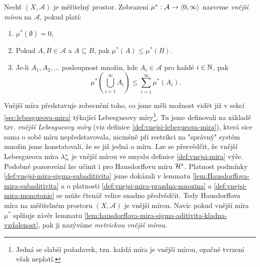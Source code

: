 \begin{definition}\label{def:vnejsi-mira}
    Nechť $(X,\mathcal{A})$ je měřitelný prostor. Zobrazení $\mu^*:\mathcal{A} \rightarrow \langle0,\infty\rangle$ nazveme \emph{vnější mírou} na $\mathcal{A}$, pokud platí:
    \begin{enumerate}[label=(\alph*)]
        \item\label{def:vnejsi-mira-prazdna-mnozina} $\mu^*(\emptyset)=0$,
        \item\label{def:vnejsi-mira-monotonie} Pokud $A,B\in\mathcal{A}$ a $A\subseteq B$, pak $\mu^*(A)\leqslant\mu^*(B)$.
        \item\label{def:vnejsi-mira-sigma-subaditivita} Je-li $A_1,A_2,\ldots$ posloupnost množin, kde $A_i\in\mathcal{A}$ pro každé $i\in\mathbb{N}$, pak
        \[\mu^*\left(\bigcup_{i=1}^\infty A_i\right)\leqslant\sum_{i=1}^{\infty}\mu^*(A_i).\]
    \end{enumerate}
\end{definition}

Vnější míra představuje zobecnění toho, co jsme měli možnost vidět již v sekci \ref{sec:lebesgueova-mira} týkající Lebesgueovy míry\footnote{Jedná se slabší požadavek, tzn. každá míra je vnější mírou, opačné tvrzení však neplatí.}. Tu jsme definovali na základě tzv. \emph{vnější Lebesgueovy míry} (viz definice \ref{def:vnejsi-lebegueova-mira}), která sice sama o sobě míru nepředstavovala, nicméně při restrikci na "správný" systém množin jsme konstatovali, že se již jedná o míru. Lze se přesvědčit, že vnější Lebesgueova míra $\lambda_n^*$ je vnější mírou ve smyslu definice \ref{def:vnejsi-mira} výše. Podobné pozorování lze učinit i pro Hausdorffovu míru $\mathcal{H}^{s}$. Platnost podmínky \ref{def:vnejsi-mira-sigma-subaditivita} jsme dokázali v lemmatu \ref{lem:Hausdorffova-mira-subaditivita} a o platnosti \ref{def:vnejsi-mira-prazdna-mnozina} a \ref{def:vnejsi-mira-monotonie} se může čtenář velice snadno předvědčit. Tedy Hausdorffova míra na měřitelném prostoru $(X,\mathcal{A})$ je vnější mírou. Navíc pokud vnější míra $\mu^*$ splňuje závěr lemmatu \ref{lem:hausdorffova-mira-sigma-aditivita-kladna-vzdalenost}, pak ji nazýváme \emph{metrickou vnější mírou}.

